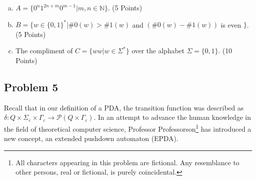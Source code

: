 \documentclass{article}
\begin{document}
\begin{enumerate}[(a)]
\item $A = \{ 0^n1^{2n+m}0^{m-1} | m,n \in \mathbb{N}\}$. (5 Points)
\item $B = \{ w \in \{0,1\}^* | \#0(w) > \#1(w)$ and $(\#0(w) - \#1(w))$ is even $\}$. (5 Points)
\item The compliment of $C = \{ww | w\in \Sigma^*\}$ over the alphabet $\Sigma = \{0,1\}$. (10 Points)

\end{enumerate}

\newpage


\subsection*{Problem 5}
        Recall that in our definition of a PDA, the transition function was described as $\delta: Q\times\Sigma_\varepsilon\times\Gamma_\varepsilon\to\mathcal{P}(Q\times\Gamma_\varepsilon)$. In an attempt to advance the human knowledge in the field of theoretical computer science, Professor Professorson\footnote{All characters appearing in this problem are fictional. Any resemblance to other persons, real or fictional, is purely coincidental.} has introduced a new concept, an extended pushdown automaton (EPDA).
        
\end{document}
